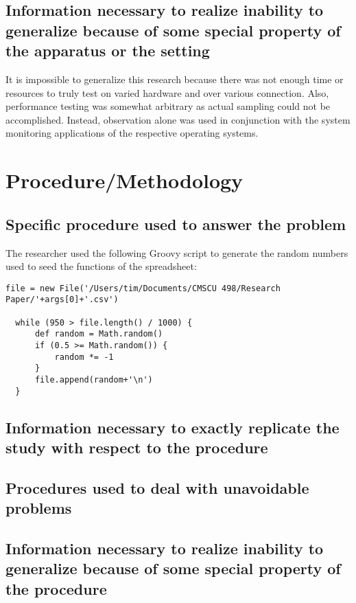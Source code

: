 \documentclass[12pt,oneside,letterpaper,titlepage]{article}
\begin{document}
\subsection{Information necessary to realize inability to generalize because of some special property of the apparatus or the setting}

It is impossible to generalize this research because there was not enough time
or resources to truly test on varied hardware and over various connection.
Also, performance testing was somewhat arbitrary as actual sampling could not be
accomplished.  Instead, observation alone was used in conjunction with the
system monitoring applications of the respective operating systems.

\section{Procedure/Methodology}


\subsection{Specific procedure used to answer the problem}

The researcher used the following Groovy script to generate the random numbers
used to seed the functions of the spreadsheet:

\lstset{basicstyle=\small}
\begin{lstlisting}[frame=single,breaklines]
  file = new File('/Users/tim/Documents/CMSCU 498/Research Paper/'+args[0]+'.csv')

  while (950 > file.length() / 1000) {
      def random = Math.random()
      if (0.5 >= Math.random()) {
          random *= -1
      }
      file.append(random+'\n')
  }
\end{lstlisting}

\subsection{Information necessary to exactly replicate the study with respect to the procedure}

\subsection{Procedures used to deal with unavoidable problems}

\subsection{Information necessary to realize inability to generalize because of some special property of the procedure}
\end{document}
